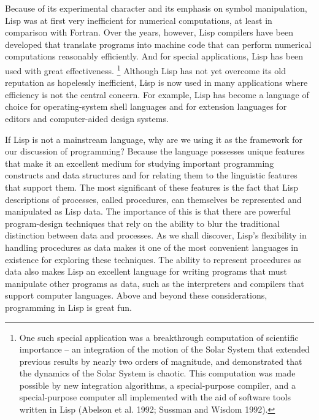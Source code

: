Because of its experimental character and its emphasis on symbol manipulation,
Lisp was at first very inefficient for numerical computations,
at least in comparison with Fortran.
Over the years, however,
Lisp compilers have been developed that translate programs into machine code
that can perform numerical computations reasonably efficiently.
And for special applications, Lisp has been used with great effectiveness.
\footnote{%
   One such special application was a breakthrough computation of scientific importance
   -- an integration of the motion of the Solar System that extended previous results by nearly two orders of magnitude,
   and demonstrated that the dynamics of the Solar System is chaotic.
   This computation was made possible by new integration algorithms, a special-purpose compiler,
   and a special-purpose computer all implemented with the aid of software tools written in Lisp
   (Abelson et al. 1992; Sussman and Wisdom 1992).
}
Although Lisp has not yet overcome its old reputation as hopelessly inefficient,
Lisp is now used in many applications where efficiency is not the central concern.
For example, Lisp has become a language of choice for operating-system shell languages
and for extension languages for editors and computer-aided design systems.

If Lisp is not a mainstream language,
why are we using it as the framework for our discussion of programming?
Because the language possesses unique features
that make it an excellent medium for studying important programming constructs
and data structures and for relating them to the linguistic features that support them.
The most significant of these features is the fact that Lisp descriptions of processes,
called procedures,
can themselves be represented and manipulated as Lisp data.
The importance of this is that there are powerful program-design techniques
that rely on the ability to blur the traditional distinction
between  data and  processes.
As we shall discover,
Lisp's flexibility in handling procedures as data
makes it one of the most convenient languages in existence for exploring these techniques.
The ability to represent procedures as data also makes Lisp an excellent language
for writing programs that must manipulate other programs as data,
such as the interpreters and compilers that support computer languages.
Above and beyond these considerations, programming in Lisp is great fun.
